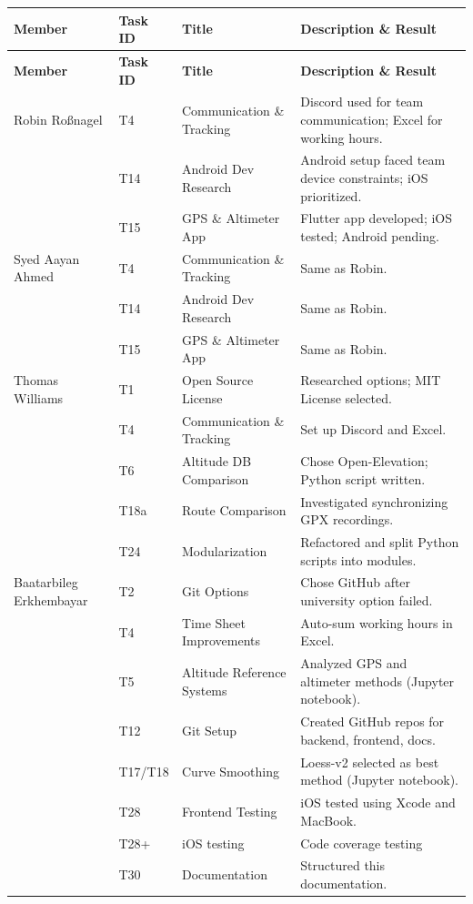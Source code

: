 \documentclass[12pt]{article}
\begin{document}
\begin{longtable}{p{3cm} p{1.5cm} p{4cm} p{7cm}}
\toprule
\textbf{Member} & \textbf{Task ID} & \textbf{Title} & \textbf{Description \& Result} \\
\midrule
\endfirsthead
\toprule
\textbf{Member} & \textbf{Task ID} & \textbf{Title} & \textbf{Description \& Result} \\
\midrule
\endhead
Robin Roßnagel & T4 & Communication \& Tracking & Discord used for team communication; Excel for working hours. \\
& T14 & Android Dev Research & Android setup faced team device constraints; iOS prioritized. \\
& T15 & GPS \& Altimeter App & Flutter app developed; iOS tested; Android pending. \\
\midrule
Syed Aayan Ahmed & T4 & Communication \& Tracking & Same as Robin. \\
& T14 & Android Dev Research & Same as Robin. \\
& T15 & GPS \& Altimeter App & Same as Robin. \\
\midrule
Thomas Williams & T1 & Open Source License & Researched options; MIT License selected. \\
& T4 & Communication \& Tracking & Set up Discord and Excel. \\
& T6 & Altitude DB Comparison & Chose Open-Elevation; Python script written. \\
& T18a & Route Comparison & Investigated synchronizing GPX recordings. \\
& T24 & Modularization & Refactored and split Python scripts into modules. \\
\midrule
Baatarbileg Erkhembayar & T2 & Git Options & Chose GitHub after university option failed. \\
& T4 & Time Sheet Improvements & Auto-sum working hours in Excel. \\
& T5 & Altitude Reference Systems & Analyzed GPS and altimeter methods (Jupyter notebook). \\
& T12 & Git Setup & Created GitHub repos for backend, frontend, docs. \\
& T17/T18 & Curve Smoothing & Loess-v2 selected as best method (Jupyter notebook). \\
& T28 & Frontend Testing & iOS tested using Xcode and MacBook. \\
& T28+ & iOS testing & Code coverage testing\\
& T30 & Documentation & Structured this documentation. \\

\end{longtable}
\end{document}
